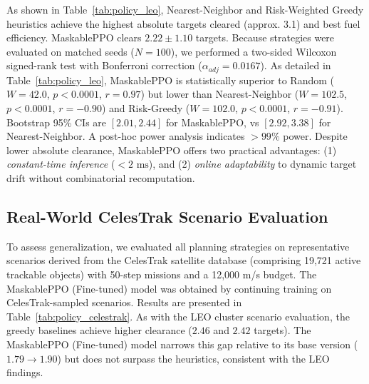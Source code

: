 \documentclass[10pt,conference,a4paper]{IEEEtran}
\begin{document}
As shown in Table~\ref{tab:policy_leo}, Nearest-Neighbor and Risk-Weighted Greedy heuristics achieve the highest absolute targets cleared (approx. 3.1) and best fuel efficiency. MaskablePPO clears $2.22 \pm 1.10$ targets. Because strategies were evaluated on matched seeds ($N=100$), we performed a two-sided Wilcoxon signed-rank test with Bonferroni correction ($\alpha_{adj} = 0.0167$). As detailed in Table~\ref{tab:policy_leo}, MaskablePPO is statistically superior to Random ($W=42.0$, $p<0.0001$, $r=0.97$) but lower than Nearest-Neighbor ($W=102.5$, $p<0.0001$, $r=-0.90$) and Risk-Greedy ($W=102.0$, $p<0.0001$, $r=-0.91$). Bootstrap 95\% CIs are $[2.01, 2.44]$ for MaskablePPO, vs $[2.92, 3.38]$ for Nearest-Neighbor. A post-hoc power analysis indicates $>99\%$ power. Despite lower absolute clearance, MaskablePPO offers two practical advantages: (1) \textit{constant-time inference} ($<2\text{ ms}$), and (2) \textit{online adaptability} to dynamic target drift without combinatorial recomputation.

\subsection{Real-World CelesTrak Scenario Evaluation}
To assess generalization, we evaluated all planning strategies on representative scenarios derived from the CelesTrak satellite database (comprising 19,721 active trackable objects) \cite{celestrak} with 50-step missions and a 12,000 m/s budget. The MaskablePPO (Fine-tuned) model was obtained by continuing training on CelesTrak-sampled scenarios. Results are presented in Table~\ref{tab:policy_celestrak}. As with the LEO cluster scenario evaluation, the greedy baselines achieve higher clearance ($2.46$ and $2.42$ targets). The MaskablePPO (Fine-tuned) model narrows this gap relative to its base version ($1.79 \rightarrow 1.90$) but does not surpass the heuristics, consistent with the LEO findings.
\end{document}
